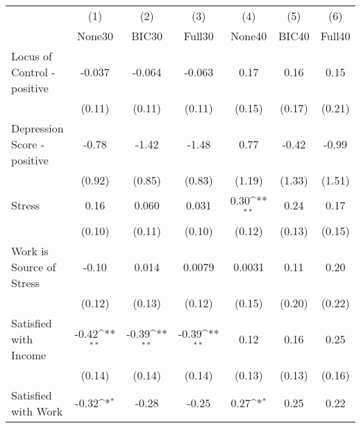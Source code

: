 {
\def\sym#1{\ifmmode^{#1}\else\(^{#1}\)\fi}
\begin{tabular}{l*{6}{c}}
\toprule
            &\multicolumn{1}{c}{(1)}&\multicolumn{1}{c}{(2)}&\multicolumn{1}{c}{(3)}&\multicolumn{1}{c}{(4)}&\multicolumn{1}{c}{(5)}&\multicolumn{1}{c}{(6)}\\
            &\multicolumn{1}{c}{None30}&\multicolumn{1}{c}{BIC30}&\multicolumn{1}{c}{Full30}&\multicolumn{1}{c}{None40}&\multicolumn{1}{c}{BIC40}&\multicolumn{1}{c}{Full40}\\
\midrule
Locus of Control - positive&      -0.037         &      -0.064         &      -0.063         &        0.17         &        0.16         &        0.15         \\
            &      (0.11)         &      (0.11)         &      (0.11)         &      (0.15)         &      (0.17)         &      (0.21)         \\
\addlinespace
Depression Score - positive&       -0.78         &       -1.42         &       -1.48         &        0.77         &       -0.42         &       -0.99         \\
            &      (0.92)         &      (0.85)         &      (0.83)         &      (1.19)         &      (1.33)         &      (1.51)         \\
\addlinespace
Stress      &        0.16         &       0.060         &       0.031         &        0.30\sym{**} &        0.24         &        0.17         \\
            &      (0.10)         &      (0.11)         &      (0.10)         &      (0.12)         &      (0.13)         &      (0.15)         \\
\addlinespace
Work is Source of Stress&       -0.10         &       0.014         &      0.0079         &      0.0031         &        0.11         &        0.20         \\
            &      (0.12)         &      (0.13)         &      (0.12)         &      (0.15)         &      (0.20)         &      (0.22)         \\
\addlinespace
Satisfied with Income&       -0.42\sym{**} &       -0.39\sym{**} &       -0.39\sym{**} &        0.12         &        0.16         &        0.25         \\
            &      (0.14)         &      (0.14)         &      (0.14)         &      (0.13)         &      (0.13)         &      (0.16)         \\
\addlinespace
Satisfied with Work&       -0.32\sym{*}  &       -0.28         &       -0.25         &        0.27\sym{*}  &        0.25         &        0.22         \\

\end{tabular}}
